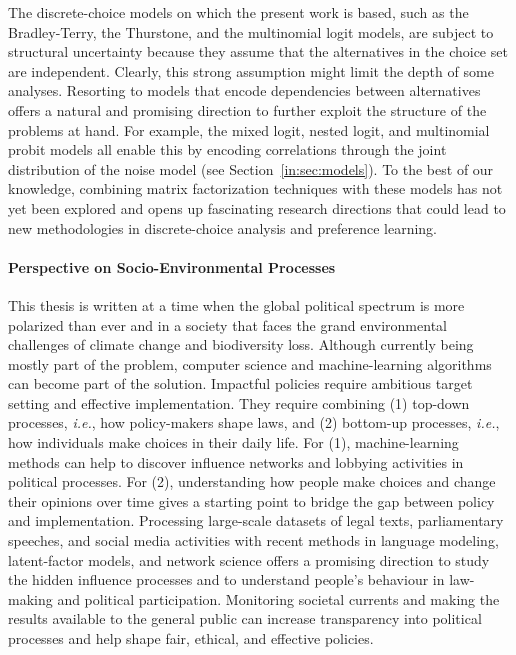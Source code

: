 The discrete-choice models on which the present work is based, such as the Bradley-Terry, the Thurstone, and the multinomial logit models, are subject to structural uncertainty because they assume that the alternatives in the choice set are independent.
Clearly, this strong assumption might limit the depth of some analyses.
Resorting to models that encode dependencies between alternatives offers a natural and promising direction to further exploit the structure of the problems at hand.
For example, the mixed logit, nested logit, and multinomial probit models all enable this by encoding correlations through the joint distribution of the noise model (see Section~\ref{in:sec:models}).
To the best of our knowledge, combining matrix factorization techniques with these models has not yet been explored and opens up fascinating research directions that could lead to new methodologies in discrete-choice analysis and preference learning.

\paragraph{Perspective on Socio-Environmental Processes}

This thesis is written at a time when the global political spectrum is more polarized than ever and in a society that faces the grand environmental challenges of climate change and biodiversity loss.
Although currently being mostly part of the problem, computer science and machine-learning algorithms can become part of the solution.
Impactful policies require ambitious target setting and effective implementation.
They require combining (1) top-down processes, \textit{i.e.}, how policy-makers shape laws, and (2) bottom-up processes, \textit{i.e.}, how individuals make choices in their daily life.
For (1), machine-learning methods can help to discover influence networks and lobbying activities in political processes.
For (2), understanding how people make choices and change their opinions over time gives a starting point to bridge the gap between policy and implementation.
Processing large-scale datasets of legal texts, parliamentary speeches, and social media activities with recent methods in language modeling, latent-factor models, and network science offers a promising direction to study the hidden influence processes and to understand people's behaviour in law-making and political participation.
Monitoring societal currents and making the results available to the general public can increase transparency into political processes and help shape fair, ethical, and effective policies.

